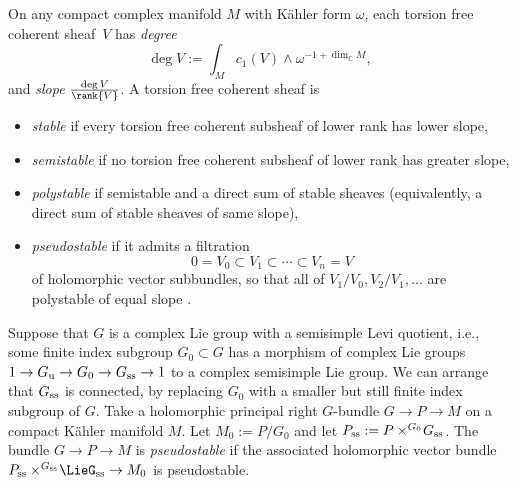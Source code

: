 \documentclass[10pt,a4paper]{amsart}
\providecommand{\C}{}
\numberwithin{equation}{section}
\renewcommand{\C}{\mathbb{C}}
\newcommand{\amal}[3]{\ensuremath{{#1} \mathbin{\times^{#2}} \! #3}}
\newcommand*{\dimC}[1]{\ensuremath{\dim_{\C} \! #1}}
\begin{document}
On any compact complex manifold $M$ with K\"ahler form $\omega$, each torsion free coherent sheaf~$V$
has \emph{degree} \cite[p.~168]{Kobayashi:1987}
\[
\deg{V} := \int_M c_1(V) \wedge \omega^{-1 + \dimC{M}},
\]
and \emph{slope} $\frac{\deg{V}}{\rank{V}}$. A torsion free coherent sheaf is
\begin{itemize}\itemsep=0pt
\item
\emph{stable} if every torsion free coherent subsheaf of lower rank has lower slope,
\item
\emph{semistable} if no torsion free coherent subsheaf of lower rank has greater slope,
\item
\emph{polystable} if semistable and a direct sum of stable sheaves (equivalently, a direct sum of
stable sheaves of same slope),
\item
\emph{pseudostable} if it admits a filtration
\[0 = V_0 \subset V_1 \subset \cdots \subset V_n = V\] of holomorphic vector
subbundles, so that all of $V_1/V_0, V_2/V_1, \dots$ are polystable of equal slope \cite[p. 168]{Kobayashi:1987}.
\end{itemize}
Suppose that $G$ is a complex Lie group with a semisimple Levi quotient, i.e., some finite index
subgroup $G_0 \subset G$ has a morphism of complex Lie groups
$1 \to G_{\rm u} \to G_0 \to G_{\rm ss} \to 1$ to a complex semisimple Lie group.
We can arrange that $G_{\rm ss}$ is connected, by replacing $G_0$ with a smaller but still finite index
subgroup of $G$.
Take a holomorphic principal right $G$-bundle $G \to P \to M$ on a compact K\"ahler manifold $M$.
Let $M_0 := P/G_0$ and let $P_{\rm ss} := \amal{P}{G_0}{G_{\rm ss}}$.
The bundle $G \to P \to M$ is \emph{pseudostable} if the associated holomorphic
vector bundle $\amal{P_{\rm ss}}{G_{\rm ss}}{\LieG_{\rm ss}} \to M_0$ is pseudostable.
\end{document}
